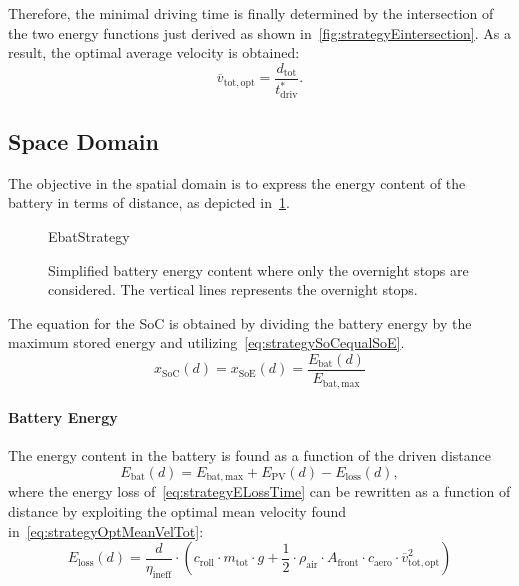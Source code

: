 Therefore, the minimal driving time is finally determined by the intersection of the two energy functions just derived as shown in~\cref{fig:strategyEintersection}. As a result, the optimal average velocity is obtained:
\begin{equation}
	\overline{v}_\mathrm{tot,opt} = \frac{d_\mathrm{tot}}{t_\mathrm{driv}^*}. \label{eq:strategyOptMeanVelTot}
\end{equation}


\subsection{Space Domain}
\label{sec:strategySpaceDomain}
The objective in the spatial domain is to express the energy content of the battery in terms of distance, as depicted in~\cref{fig:strategyEbat}.
\begin{figure}[htbp]
	\centering
	\begin{externalize}{EbatStrategy}
		
	\end{externalize}
	\caption{Simplified battery energy content where only the overnight stops are considered. The vertical lines represents the overnight stops.}
	\label{fig:strategyEbat}
\end{figure}

The equation for the SoC is obtained by dividing the battery energy by the maximum stored energy and utilizing~\cref{eq:strategySoCequalSoE}.
\begin{equation}
	x_\mathrm{SoC}(d) = x_\mathrm{SoE}(d) = \frac{E_\mathrm{bat}(d)}{E_\mathrm{bat,max}} 
\end{equation}

\paragraph{Battery Energy}
The energy content in the battery is found as a function of the driven distance
\begin{equation}
	E_\mathrm{bat}(d) = E_\mathrm{bat,max} + E_\mathrm{PV}(d) - E_\mathrm{loss}(d), \label{eq:strategyEbatDist}
\end{equation}
where the energy loss of~\cref{eq:strategyELossTime} can be rewritten as a function of distance by exploiting the optimal mean velocity found in~\cref{eq:strategyOptMeanVelTot}:
\begin{equation}
	E_\mathrm{loss}(d) = \frac{d}{\eta_\mathrm{ineff}} \cdot \left(c_\mathrm{roll} \cdot m_\mathrm{tot} \cdot g + \frac{1}{2} \cdot \rho_\mathrm{air} \cdot A_\mathrm{front} \cdot c_\mathrm{aero} \cdot \overline{v}_\mathrm{tot,opt}^2 \right)
\end{equation}

